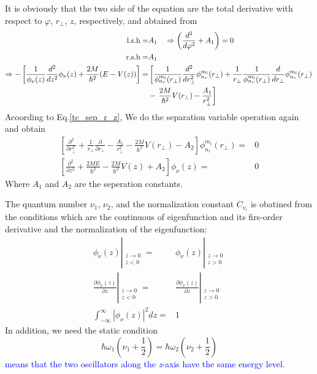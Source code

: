 It is obviously that the two side of the equation are the total derivative with respect to $\varphi$, $r_\perp$, $z$, respectively, and abtained from 
\begin{align}
\text{l.s.h} =& A_1 \quad \Rightarrow \left(\frac{d^2}{d\varphi^2} + A_1 \right) = 0  \\
\text{r.s.h} =& A_1 \\
\Rightarrow -\left[ \frac{1}{\phi_\nu(z)}\frac{d^2}{dz^2}\phi_{\nu}(z) + \frac{2M}{\hbar^2}(E - V(z)) \right] =& \left[  \frac{1}{\phi_{n_r}^{m_l}(r_\perp)} \frac{d^2}{d r_\perp^2} \phi_{n_r}^{m_l}(r_\perp)  + \frac{1}{r_\perp} \frac{1}{\phi_{n_r}^{m_l}(r_\perp)}\frac{d}{d r_\perp}\phi_{n_r}^{m_l}(r_\perp) \right. \label{tc_sep_r_z} \\
& - \left. \frac{2M}{\hbar^2} V(r_\perp) - \frac{A_1}{r_\perp^2} \right] \notag
\end{align}
Acoording to Eq.\eqref{tc_sep_r_z}, We do the separation variable operation again and obtain
\begin{equation}
\begin{aligned}
  \left[\frac{\partial^{2}}{\partial r_{\perp}^{2}}+\frac{1}{r_{\perp}} \frac{\partial}{\partial r_{\perp}}-\frac{A_{1}}{r_{\perp}^{2}}-\frac{2 M}{\hbar^{2}} V\left(r_{\perp}\right)-A_{2}\right] \phi_{n_{r}}^{m_{l}}\left(r_{\perp}\right)=& 0 \\
  \left[\frac{\partial^{2}}{\partial z^{2}}+\frac{2 M E}{\hbar^{2}}-\frac{2 M}{\hbar^{2}} V(z)+A_{2}\right] \phi_{\nu}(z)=& 0
\end{aligned}
\end{equation}
Where $A_1$ and $A_2$ are the seperation constants.

The quantum number $\nu_1$, $\nu_2$, and the normalization constant $C_{v_i}$ is obatined from the conditions which are the continuous of eigenfunction and its firs-order derivative and the normalization of the eigenfunction:
\begin{align}
\phi_{\nu}(z)\left|_{\substack{z \rightarrow 0 \\ z<0}}\right. =& \phi_{\nu}(z)\left|_{\substack{z \rightarrow 0 \\ z>0}} \right.  \label{tc_wave_con}\\
\frac{\partial\phi_\nu(z)}{\partial z} \left|_{\substack{z \rightarrow 0 \\ z< 0}} \right. =& \frac{\partial\phi_\nu(z)}{\partial z} \left|_{\substack{z \rightarrow 0 \\ z > 0}} \right. \label{tc_wave_one_order_con} \\  
\int_{-\infty}^{\infty} \left| \phi_\nu(z) \right| ^2 dz =& 1 \label{tc_wave_norm}
\end{align}
In addition, we need the static condition
\begin{equation}
\hbar\omega_1(\nu_1 + \frac{1}{2}) = \hbar\omega_2(\nu_2 + \frac{1}{2}) \label{tc_static_con}
\end{equation}
\textcolor{blue}{ means that the two oscillators along the \textit{z}-axis have the same energy level.}

